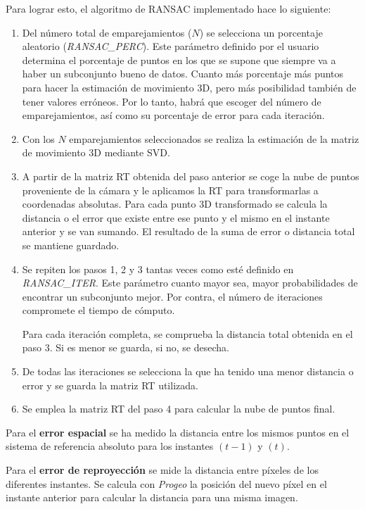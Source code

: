 Para lograr esto, el algoritmo de RANSAC implementado hace lo siguiente:

\begin{enumerate}
\item Del número total de emparejamientos ($N$) se selecciona un porcentaje aleatorio (\textit{RANSAC\_PERC}). Este parámetro definido por el usuario determina el porcentaje de puntos en los que se supone que siempre va a haber un subconjunto bueno de datos. Cuanto más porcentaje más puntos para hacer la estimación de movimiento 3D, pero más posibilidad también de tener valores erróneos. Por lo tanto,  habrá que escoger del número de emparejamientos, así como su porcentaje de error para cada iteración.

\item Con los $N$ emparejamientos seleccionados se realiza la estimación de la matriz de movimiento 3D mediante SVD.

\item A partir de la matriz RT obtenida del paso anterior se coge la nube de puntos proveniente de la cámara y le aplicamos la RT para transformarlas a coordenadas absolutas. Para cada punto 3D transformado se calcula la distancia o el error que existe entre ese punto y el mismo en el instante anterior y se van sumando. El resultado de la suma de error o distancia total se mantiene guardado.

\item Se repiten los pasos 1, 2 y 3 tantas veces como esté definido en \textit{RANSAC\_ITER}. Este parámetro cuanto mayor sea, mayor probabilidades de encontrar un subconjunto mejor. Por contra, el número de iteraciones compromete el tiempo de cómputo.

Para cada iteración completa, se comprueba la distancia total obtenida en el paso 3. Si es menor se guarda, si no, se desecha.
 
\item De todas las iteraciones se selecciona la que ha tenido una menor distancia o error y se guarda la matriz RT utilizada.

\item Se emplea la matriz RT del paso 4 para calcular la nube de puntos final.

\end{enumerate}

Para el \textbf{error espacial} se ha medido la distancia entre los mismos puntos en el sistema de referencia absoluto para los instantes $(t-1)$ y $(t)$. 

Para el \textbf{error de reproyección} se mide la distancia entre píxeles de los diferentes instantes. Se calcula con \textit{Progeo} la posición del nuevo píxel en el instante anterior para calcular la distancia para una misma imagen.

